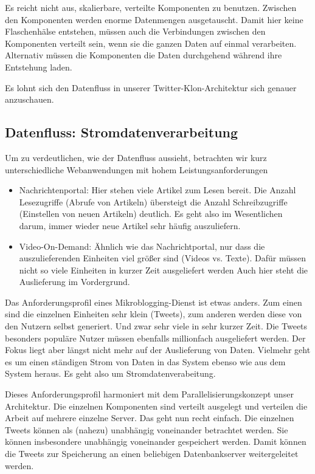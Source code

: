 Es reicht nicht aus, skalierbare, verteilte Komponenten zu benutzen. Zwischen den Komponenten werden enorme
Datenmengen ausgetauscht. Damit hier keine Flaschenhälse entstehen, müssen auch die Verbindungen zwischen
den Komponenten verteilt sein, wenn sie die ganzen Daten auf einmal verarbeiten. Alternativ müssen die
Komponenten die Daten durchgehend während ihre Entstehung laden.

Es lohnt sich den Datenfluss in unserer Twitter-Klon-Architektur sich genauer anzuschauen.

\subsection{Datenfluss: Stromdatenverarbeitung}
Um zu verdeutlichen, wie der Datenfluss aussieht, betrachten wir kurz unterschiedliche Webanwendungen mit hohem
Leistungsanforderungen
\begin{itemize}
  \item Nachrichtenportal: Hier stehen viele Artikel zum Lesen bereit. Die Anzahl Lesezugriffe (Abrufe von Artikeln)
  übersteigt die Anzahl Schreibzugriffe (Einstellen von neuen Artikeln) deutlich. Es geht also im Wesentlichen darum,
  immer wieder neue Artikel sehr häufig auszuliefern.
  \item Video-On-Demand: Ähnlich wie das Nachrichtportal, nur dass die auszulieferenden Einheiten viel größer
  sind (Videos vs. Texte). Dafür müssen nicht so viele Einheiten in kurzer Zeit ausgeliefert werden
  Auch hier steht die Auslieferung im Vordergrund.
\end{itemize}
Das Anforderungsprofil eines Mikroblogging-Dienst ist etwas anders. Zum einen sind die einzelnen Einheiten sehr klein
(Tweets), zum anderen werden diese von den Nutzern selbst generiert. Und zwar sehr viele in sehr kurzer Zeit.
Die Tweets besonders populäre Nutzer müssen ebenfalls millionfach ausgeliefert werden. Der Fokus liegt aber
längst nicht mehr auf der Auslieferung von Daten. Vielmehr geht es um einen ständigen Strom von Daten
in das System ebenso wie aus dem System heraus. Es geht also um Stromdatenverabeitung.

Dieses Anforderungsprofil harmoniert mit dem Parallelisierungskonzept unser Architektur. Die einzelnen Komponenten
sind verteilt ausgelegt und verteilen die Arbeit auf mehrere einzelne Server. Das geht nun recht einfach. Die
einzelnen Tweets können als (nahezu) unabhängig voneinander betrachtet werden. Sie können insbesondere unabhängig
voneinander gespeichert werden. Damit können die Tweets zur Speicherung an einen beliebigen Datenbankserver weitergeleitet
werden.

